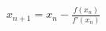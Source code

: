 \documentclass[preview]{standalone}
\begin{document}
\begin{center}
$x_{n+1} = x_n -\frac{f(x_n)}{f'(x_n)}$
\end{center}
\end{document}
